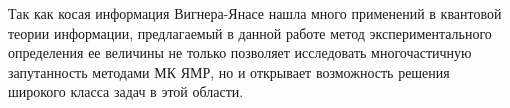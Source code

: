 Так как косая информация Вигнера-Янасе нашла много применений в квантовой теории информации, %
предлагаемый в данной работе метод экспериментального определения ее величины
не только позволяет исследовать многочастичную запутанность методами МК ЯМР,
но и открывает возможность решения широкого класса задач в этой области.